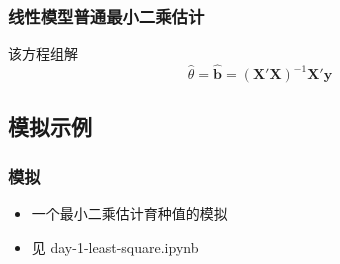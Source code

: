 \documentclass[serif,aspectratio=169]{beamer}
\begin{document}
\begin{frame}
  \frametitle{线性模型普通最小二乘估计}
  \begin{block}{该方程组解}
    $$\hat{\theta} = \hat{\mathbf{b}} = (\mathbf{X}'\mathbf{X})^{-1}\mathbf{X'y}$$
  \end{block}
\end{frame}


\subsection{模拟示例}
\begin{frame}
  \frametitle{模拟}
  \begin{itemize}
  \item 一个最小二乘估计育种值的模拟
  \item 见 {\color{cyan}day-1-least-square.ipynb}
  \end{itemize}
\end{frame}
\end{document}

